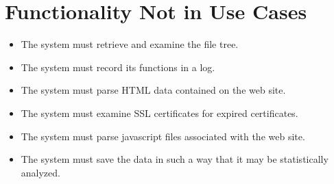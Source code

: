 \section{Functionality Not in Use Cases}
\begin{itemize}
    \item The system must retrieve and examine the file tree.
    \item The system must record its functions in a log.
    \item The system must parse HTML data contained on the web site.
    \item The system must examine SSL certificates for expired certificates.
    \item The system must parse javascript files associated with the web site.
    \item The system must save the data in such a way that it may be statistically analyzed.
\end{itemize}
